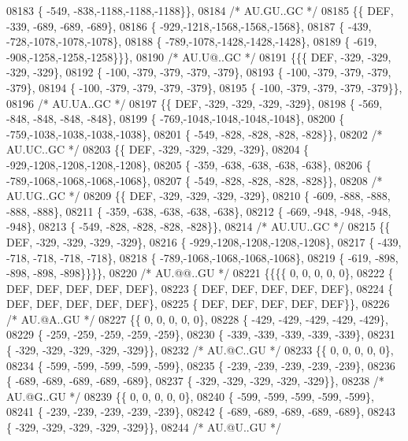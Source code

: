 \begin{DoxyCode}
08183 \{ -549, -838,-1188,-1188,-1188\}\},
08184 \textcolor{comment}{/* AU.GU..GC */}
08185 \{\{  DEF, -339, -689, -689, -689\},
08186 \{ -929,-1218,-1568,-1568,-1568\},
08187 \{ -439, -728,-1078,-1078,-1078\},
08188 \{ -789,-1078,-1428,-1428,-1428\},
08189 \{ -619, -908,-1258,-1258,-1258\}\}\},
08190 \textcolor{comment}{/* AU.U@..GC */}
08191 \{\{\{  DEF, -329, -329, -329, -329\},
08192 \{ -100, -379, -379, -379, -379\},
08193 \{ -100, -379, -379, -379, -379\},
08194 \{ -100, -379, -379, -379, -379\},
08195 \{ -100, -379, -379, -379, -379\}\},
08196 \textcolor{comment}{/* AU.UA..GC */}
08197 \{\{  DEF, -329, -329, -329, -329\},
08198 \{ -569, -848, -848, -848, -848\},
08199 \{ -769,-1048,-1048,-1048,-1048\},
08200 \{ -759,-1038,-1038,-1038,-1038\},
08201 \{ -549, -828, -828, -828, -828\}\},
08202 \textcolor{comment}{/* AU.UC..GC */}
08203 \{\{  DEF, -329, -329, -329, -329\},
08204 \{ -929,-1208,-1208,-1208,-1208\},
08205 \{ -359, -638, -638, -638, -638\},
08206 \{ -789,-1068,-1068,-1068,-1068\},
08207 \{ -549, -828, -828, -828, -828\}\},
08208 \textcolor{comment}{/* AU.UG..GC */}
08209 \{\{  DEF, -329, -329, -329, -329\},
08210 \{ -609, -888, -888, -888, -888\},
08211 \{ -359, -638, -638, -638, -638\},
08212 \{ -669, -948, -948, -948, -948\},
08213 \{ -549, -828, -828, -828, -828\}\},
08214 \textcolor{comment}{/* AU.UU..GC */}
08215 \{\{  DEF, -329, -329, -329, -329\},
08216 \{ -929,-1208,-1208,-1208,-1208\},
08217 \{ -439, -718, -718, -718, -718\},
08218 \{ -789,-1068,-1068,-1068,-1068\},
08219 \{ -619, -898, -898, -898, -898\}\}\}\},
08220 \textcolor{comment}{/* AU.@@..GU */}
08221 \{\{\{\{    0,    0,    0,    0,    0\},
08222 \{  DEF,  DEF,  DEF,  DEF,  DEF\},
08223 \{  DEF,  DEF,  DEF,  DEF,  DEF\},
08224 \{  DEF,  DEF,  DEF,  DEF,  DEF\},
08225 \{  DEF,  DEF,  DEF,  DEF,  DEF\}\},
08226 \textcolor{comment}{/* AU.@A..GU */}
08227 \{\{    0,    0,    0,    0,    0\},
08228 \{ -429, -429, -429, -429, -429\},
08229 \{ -259, -259, -259, -259, -259\},
08230 \{ -339, -339, -339, -339, -339\},
08231 \{ -329, -329, -329, -329, -329\}\},
08232 \textcolor{comment}{/* AU.@C..GU */}
08233 \{\{    0,    0,    0,    0,    0\},
08234 \{ -599, -599, -599, -599, -599\},
08235 \{ -239, -239, -239, -239, -239\},
08236 \{ -689, -689, -689, -689, -689\},
08237 \{ -329, -329, -329, -329, -329\}\},
08238 \textcolor{comment}{/* AU.@G..GU */}
08239 \{\{    0,    0,    0,    0,    0\},
08240 \{ -599, -599, -599, -599, -599\},
08241 \{ -239, -239, -239, -239, -239\},
08242 \{ -689, -689, -689, -689, -689\},
08243 \{ -329, -329, -329, -329, -329\}\},
08244 \textcolor{comment}{/* AU.@U..GU */}

\end{DoxyCode}

